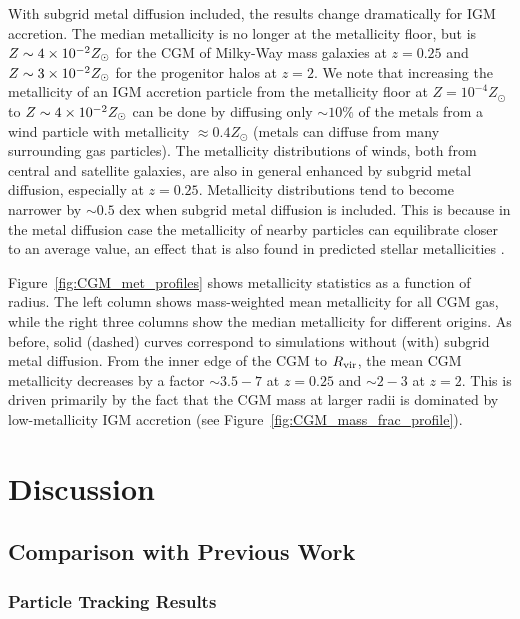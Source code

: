 \documentclass[fleqn,usenatbib]{mnras}
\begin{document}
With subgrid metal diffusion included, the results change dramatically for IGM accretion.
The median metallicity is no longer at the metallicity floor, but is $Z\sim4\times10^{-2} Z_\odot$ for the CGM of Milky-Way mass galaxies at $z=0.25$ and $Z\sim3\times10^{-2} Z_\odot$ for the progenitor halos at $z=2$.
We note that increasing the metallicity of an IGM accretion particle from the metallicity floor at $Z = 10^{-4} Z_\odot$ to $Z\sim4\times10^{-2} Z_\odot$ can be done by diffusing only $\sim10\%$ of the metals from a wind particle with metallicity $\approx 0.4 Z_\odot$ (metals can diffuse from many surrounding gas particles).
The metallicity distributions of winds, both from central and satellite galaxies, are also in general enhanced by subgrid metal diffusion, especially at $z=0.25$. 
Metallicity distributions tend to become narrower by $\sim 0.5$ dex when subgrid metal diffusion is included.
This is because in the metal diffusion case the metallicity of nearby particles can equilibrate closer to an average value, an effect that is also found in predicted stellar metallicities \citep[][]{Escala2018}. 

Figure~\ref{fig:CGM_met_profiles} shows metallicity statistics as a function of radius.
The left column shows mass-weighted mean metallicity for all CGM gas, while the right three columns show the median metallicity for different origins.
As before, solid (dashed) curves correspond to simulations without (with) subgrid metal diffusion.
From the inner edge of the CGM to $R_{\rm vir}$, the mean CGM metallicity decreases by a factor $\sim 3.5-7$ at $z=0.25$ and $\sim 2-3$ at $z=2$. 
This is driven primarily by the fact that the CGM mass at larger radii is dominated by low-metallicity IGM accretion (see Figure~\ref{fig:CGM_mass_frac_profile}).

\section{Discussion}
\label{sec:discussion}

\subsection{Comparison with Previous Work}
\subsubsection{Particle Tracking Results}
\end{document}
